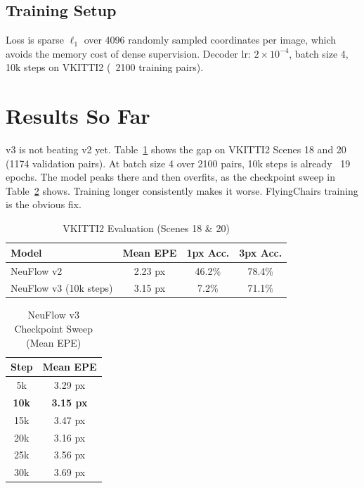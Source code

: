 \documentclass[conference]{IEEEtran}
\begin{document}
\subsection{Training Setup}

Loss is sparse $\ell_1$ over 4096 randomly sampled coordinates per image, which avoids the memory cost of dense supervision. Decoder lr: $2 \times 10^{-4}$, batch size 4, 10k steps on VKITTI2 (~2100 training pairs).

\section{Results So Far}
\label{sec:results}

v3 is not beating v2 yet. Table~\ref{tab:results} shows the gap on VKITTI2 Scenes 18 and 20 (1174 validation pairs). At batch size 4 over 2100 pairs, 10k steps is already ~19 epochs. The model peaks there and then overfits, as the checkpoint sweep in Table~\ref{tab:sweep} shows. Training longer consistently makes it worse. FlyingChairs training is the obvious fix.

\begin{table}[h]
\centering
\caption{VKITTI2 Evaluation (Scenes 18 \& 20)}
\label{tab:results}
\begin{tabular}{lccc}
\toprule
\textbf{Model} & \textbf{Mean EPE} & \textbf{1px Acc.} & \textbf{3px Acc.} \\
\midrule
NeuFlow v2~\cite{neuflowv2}   & 2.23 px & 46.2\% & 78.4\% \\
NeuFlow v3 (10k steps)        & 3.15 px & \phantom{0}7.2\% & 71.1\% \\
\bottomrule
\end{tabular}
\end{table}

\begin{table}[h]
\centering
\caption{NeuFlow v3 Checkpoint Sweep (Mean EPE)}
\label{tab:sweep}
\begin{tabular}{cc}
\toprule
\textbf{Step} & \textbf{Mean EPE} \\
\midrule
5k           & 3.29 px \\
\textbf{10k} & \textbf{3.15 px} \\
15k          & 3.47 px \\
20k          & 3.16 px \\
25k          & 3.56 px \\
30k          & 3.69 px \\
\bottomrule
\end{tabular}
\end{table}
\end{document}
